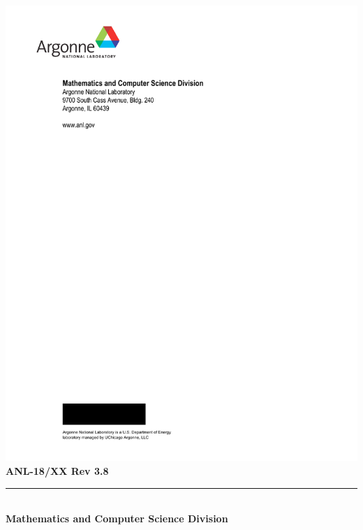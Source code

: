 %
%



\def\shortintro{false}

\usepackage{fancyhdr,lastpage}
\pagestyle{fancy}



\pagestyle{empty}
\hspace{-.65in}\includegraphics{ArgonneLogo}
\hfill  {\large {\bf ANL-18/XX Rev 3.8}}

\vspace*{2in}
\vspace*{8pt}
\hrule
\vspace*{8pt}

\vspace*{1in}
\noindent \\
{\Large {\bf Mathematics and Computer Science Division}}

